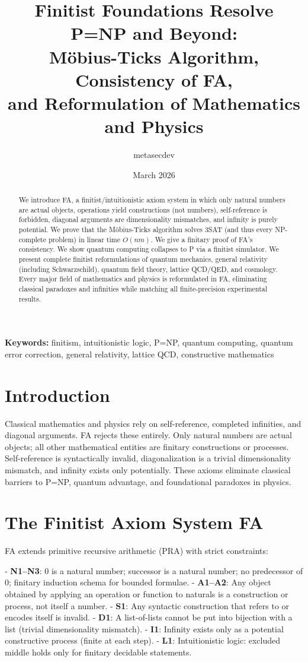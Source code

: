 \documentclass[11pt]{article}
\title{Finitist Foundations Resolve P=NP and Beyond: \\
Möbius-Ticks Algorithm, Consistency of FA, \\
and Reformulation of Mathematics and Physics}
\author{metasecdev}
\date{March 2026}
\theoremstyle{plain}
\begin{document}
\maketitle

\begin{abstract}
We introduce FA, a finitist/intuitionistic axiom system in which only natural numbers are actual objects, operations yield constructions (not numbers), self-reference is forbidden, diagonal arguments are dimensionality mismatches, and infinity is purely potential. We prove that the Möbius-Ticks algorithm solves 3SAT (and thus every NP-complete problem) in linear time $O(nm)$. We give a finitary proof of FA's consistency. We show quantum computing collapses to P via a finitist simulator. We present complete finitist reformulations of quantum mechanics, general relativity (including Schwarzschild), quantum field theory, lattice QCD/QED, and cosmology. Every major field of mathematics and physics is reformulated in FA, eliminating classical paradoxes and infinities while matching all finite-precision experimental results.
\end{abstract}

\textbf{Keywords:} finitism, intuitionistic logic, P=NP, quantum computing, quantum error correction, general relativity, lattice QCD, constructive mathematics

\section{Introduction}
Classical mathematics and physics rely on self-reference, completed infinities, and diagonal arguments. FA rejects these entirely. Only natural numbers are actual objects; all other mathematical entities are finitary constructions or processes. Self-reference is syntactically invalid, diagonalization is a trivial dimensionality mismatch, and infinity exists only potentially. These axioms eliminate classical barriers to P=NP, quantum advantage, and foundational paradoxes in physics.

\section{The Finitist Axiom System FA}

FA extends primitive recursive arithmetic (PRA) with strict constraints:

- \textbf{N1–N3}: 0 is a natural number; successor is a natural number; no predecessor of 0; finitary induction schema for bounded formulae.
- \textbf{A1–A2}: Any object obtained by applying an operation or function to naturals is a construction or process, not itself a number.
- \textbf{S1}: Any syntactic construction that refers to or encodes itself is invalid.
- \textbf{D1}: A list-of-lists cannot be put into bijection with a list (trivial dimensionality mismatch).
- \textbf{I1}: Infinity exists only as a potential constructive process (finite at each step).
- \textbf{L1}: Intuitionistic logic: excluded middle holds only for finitary decidable statements.
\end{document}
